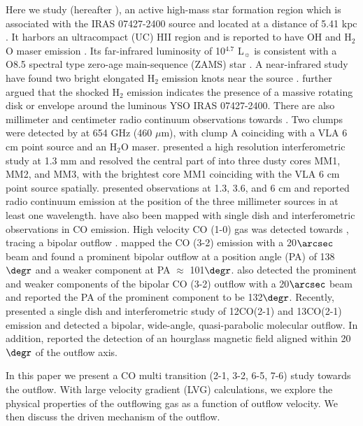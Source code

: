 Here we study  (hereafter ), an active high-mass star formation region which is associated with the IRAS 07427-2400 source and located at a distance of 5.41 kpc \citep{2015PASJ...67...69S}. It harbors an ultracompact (UC) HII region and is reported to have OH and H$_2$O maser emission \citep{1993AJ....105.1495H,1997MNRAS.289..203C,1998AJ....116.1897M,1999ApJS..123..487M,2003MNRAS.341..551C}. Its far-infrared luminosity of 10$^{4.7}$ L$_\sun$ is consistent with a O8.5 spectral type zero-age main-sequence (ZAMS) star \citep{1998AJ....116.1897M}. A near-infrared study have found two bright elongated H$_2$ emission knots near the source \citep{2002ApJ...576..313K}. \citet{2003A&A...412..175K} further argued that the shocked H$_2$ emission indicates the presence of a massive rotating disk or envelope around the luminous YSO IRAS 07427-2400. There are also millimeter and centimeter radio continuum observations towards . Two clumps were detected by \citet{2007ApJ...654L..87C} at 654 GHz (460 $\mu$m), with clump A coinciding with a VLA 6 cm point source \citep{1993AJ....105.1495H} and an H$_2$O maser. \citet{2009ApJ...696...66Q} presented a high resolution interferometric study at 1.3 mm and resolved the central part of  into three dusty cores MM1, MM2, and MM3, with the brightest core MM1 coinciding with the VLA 6 cm point source spatially. \citet{2011AJ....142..147T} presented observations at 1.3, 3.6, and 6 cm and reported radio continuum emission at the position of the three millimeter sources in at least one wavelength.  have also been mapped with single dish and interferometric observations in CO emission. High velocity CO (1-0) gas was detected towards  \citep{1991AJ....101.1435M,1996ApJ...457..267S}, tracing a bipolar outflow \citep{1996ApJ...457..267S}. \citet{1997PhDT........21H} mapped the CO (3-2) emission with a 20${\arcsec}$ beam and found a prominent bipolar outflow at a position angle (PA) of 138${\degr}$ and a weaker component at PA $\approx$ 101${\degr}$. \citet{2003A&A...412..175K} also detected the prominent and weaker components of the bipolar CO (3-2) outflow with a 20${\arcsec}$ beam and reported the PA of the prominent component to be 132${\degr}$. Recently, \citet{2009ApJ...696...66Q} presented a single dish and interferometric study of 12CO(2-1) and 13CO(2-1) emission and detected a bipolar, wide-angle, quasi-parabolic molecular outflow. In addition, \citet{2014ApJ...794L..18Q} reported the detection of an hourglass magnetic field aligned within 20${\degr}$ of the outflow axis.

In this paper we present a CO multi transition (2-1, 3-2, 6-5, 7-6) study towards the  outflow. With large velocity gradient (LVG) calculations, we explore the physical properties of the outflowing gas as a function of outflow velocity. We then discuss the driven mechanism of the outflow.



